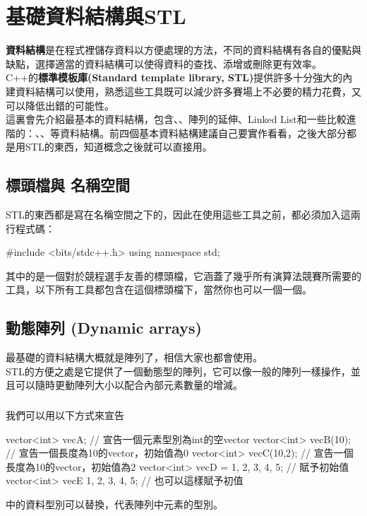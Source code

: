 \chapter{基礎資料結構與STL}
\textbf{資料結構}是在程式裡儲存資料以方便處理的方法，不同的資料結構有各自的優點與缺點，選擇適當的資料結構可以使得資料的查找、添增或刪除更有效率。\\
\indent C++的\textbf{標準模板庫(Standard template library, STL)}提供許多十分強大的內建資料結構可以使用，熟悉這些工具既可以減少許多賽場上不必要的精力花費，又可以降低出錯的可能性。\\

這裏會先介紹最基本的資料結構，包含、、陣列的延伸、Linked List和一些比較進階的：、、等資料結構。前四個基本資料結構建議自己要實作看看，之後大部分都是用STL的東西，知道概念之後就可以直接用。\\


\section{標頭檔與  名稱空間}
STL的東西都是寫在名稱空間之下的，因此在使用這些工具之前，都必須加入這兩行程式碼：
\begin{C++}
#include <bits/stdc++.h>
using namespace std;
\end{C++}

\indent 其中的是一個對於競程選手友善的標頭檔，它涵蓋了幾乎所有演算法競賽所需要的工具，以下所有工具都包含在這個標頭檔下，當然你也可以一個一個。

\section{動態陣列 (Dynamic arrays)}
最基礎的資料結構大概就是陣列了，相信大家也都會使用。\\
\indent STL的方便之處是它提供了一個動態型的陣列，它可以像一般的陣列一樣操作，並且可以隨時更動陣列大小以配合內部元素數量的增減。

\subsection{}
我們可以用以下方式來宣告
\begin{C++}
vector<int> vecA;
// 宣告一個元素型別為int的空vector
vector<int> vecB(10);
// 宣告一個長度為10的vector，初始值為0
vector<int> vecC(10,2);
// 宣告一個長度為10的vector，初始值為2
vector<int> vecD = {1, 2, 3, 4, 5}; // 賦予初始值
vector<int> vecE {1, 2, 3, 4, 5}; // 也可以這樣賦予初值
\end{C++}
\indent \inline{< >}中的資料型別可以替換，代表陣列中元素的型別。\\

